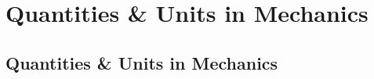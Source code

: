 \documentclass[../maths.tex]{subfiles}
\begin{document}
\chapter{Quantities \& Units in Mechanics}
\section{Quantities \& Units in Mechanics}
\end{document}
